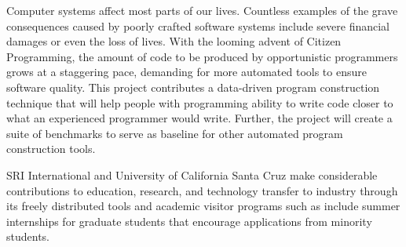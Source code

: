 Computer systems affect most parts of our lives. Countless examples of 
the grave consequences caused by poorly crafted software systems include 
severe financial damages or even the loss of lives. With the looming 
advent of Citizen Programming, the amount of code to be produced by 
opportunistic programmers grows at a staggering pace, demanding for more 
automated tools to ensure software quality. This project contributes a 
data-driven program construction technique that will help people with 
programming ability to write code closer to what an experienced programmer 
would write. Further, the project will create a suite of benchmarks to 
serve as baseline for other automated program construction tools.

SRI International and University of California Santa Cruz make considerable 
contributions to education, research, and technology transfer to industry 
through its freely distributed tools and academic visitor programs such 
as include summer internships for graduate students that encourage applications 
from minority students.